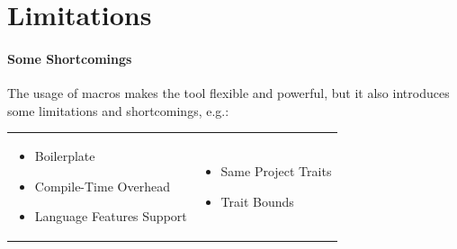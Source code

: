 \section{Limitations}\label{sec:limitations}

\begin{frame}{\secname}
	\framesubtitle{Some Shortcomings}

	The usage of macros makes the tool flexible and powerful, but it also introduces some limitations and shortcomings, e.g.:

	\begin{tabular}{p{} p{}}
		\begin{itemize}
			\item Boilerplate %
			\item Compile-Time Overhead %
			\item Language Features Support %
		\end{itemize}
		 &
		\begin{itemize}
			\item Same Project Traits %
			\item Trait Bounds %
		\end{itemize}
	\end{tabular}

\end{frame}